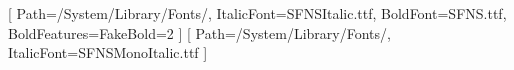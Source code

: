 \usepackage{fontspec}
\usepackage{booktabs}
\usepackage{geometry}
\usepackage{xcolor}
\usepackage{pdflscape}

\geometry{a4paper, portrait, margin=2cm}


\setmainfont{SFNS.ttf}[
  Path=/System/Library/Fonts/,
  ItalicFont=SFNSItalic.ttf,
  BoldFont=SFNS.ttf,
  BoldFeatures={FakeBold=2}
]
\setmonofont{SFNSMono.ttf}[
  Path=/System/Library/Fonts/,
  ItalicFont=SFNSMonoItalic.ttf
]

\makeatletter

\renewcommand\section{%
  \@startsection{section}{1}{\z@}%
    {-22pt \@plus -4pt \@minus -2pt}%
    {8pt \@plus 2pt}%
    {\color{headingdark}\Large\bfseries\sectionrule}}

\newcommand{\sectionrule}[1]{%
  #1\par\nobreak
  \vspace{2pt}%
  {\color{rulegrey}\hrule height 0.7pt}%
  \vspace{4pt}%
}

\renewcommand\subsection{%
  \@startsection{subsection}{2}{\z@}%
    {-14pt \@plus -3pt \@minus -2pt}%
    {5pt \@plus 1pt}%
    {\color{headingmid}\large\bfseries}}

\renewcommand\subsubsection{%
  \@startsection{subsubsection}{3}{\z@}%
    {-10pt \@plus -2pt \@minus -1pt}%
    {3pt \@plus 1pt}%
    {\color{headingdark}\normalsize\bfseries}}

\makeatother
